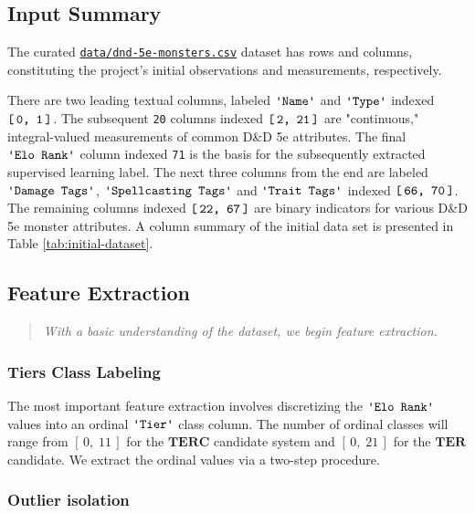 \documentclass{article}
\newcommand{\Qty}[1]{\oldstylenums{#1}}
\newcommand{\TER}{\ensuremath{\mathbf{TER}}\xspace}
\newcommand{\TERC}{\ensuremath{\mathbf{TERC}}\xspace}
\newcommand{\DnD}{D\&D 5e\xspace}
\newcommand{\Column}[1]{\ensuremath{\texttt{\textquotesingle{}#1\textquotesingle{}}}\xspace}
\newcommand{\IndexRange}[2]{\ensuremath{\texttt{{[}\,#1,\ #2\,{]}}}\xspace}
\newcommand{\NumericRange}[2]{\ensuremath{\left[\,#1,\; #2\,\right]}\xspace}
\begin{document}
\hypertarget{input-summary}{
\subsection{Input Summary}\label{input-summary}}

The curated
\href{https://github.com/recursion-ninja/CSc-74020/tree/master/data/dnd-5e-monsters.csv}{\texttt{data/dnd-5e-monsters.csv}} dataset has \Qty{1,382} rows and \Qty{72} columns, constituting the project's initial observations and measurements, respectively.

There are two leading textual columns, labeled \Column{Name} and \Column{Type} indexed
\IndexRange{0}{1}.
The subsequent \texttt{20} columns indexed \IndexRange{2}{21} are "continuous," integral-valued measurements of common \DnD attributes.
The final \Column{Elo\ Rank} column indexed \texttt{71} is the basis for the subsequently extracted supervised learning label.
The next three columns from the end are labeled \Column{Damage\ Tags}, \Column{Spellcasting\ Tags} and \Column{Trait\ Tags} indexed \IndexRange{66}{70}.
The remaining columns indexed \IndexRange{22}{67} are binary indicators for various \DnD monster attributes.
A column summary of the initial data set is presented in Table \ref{tab:initial-dataset}.

\hypertarget{feature-extraction}{%
\subsection{Feature Extraction}\label{feature-extraction}}

\begin{quote}
	{\itshape With a basic understanding of the dataset, we begin feature extraction.}
\end{quote}


\hypertarget{extraction-of-tiers}{
\subsubsection{Tiers Class Labeling}\label{extraction-of-tiers}}

The most important feature extraction involves discretizing the \Column{Elo Rank} values into an ordinal \Column{Tier} class column.
The number of ordinal classes will range from \NumericRange{0}{11} for the \TERC candidate system and \NumericRange{0}{21} for the \TER candidate.
We extract the ordinal values via a two-step procedure.


\subsubsection{Outlier isolation}
\end{document}
